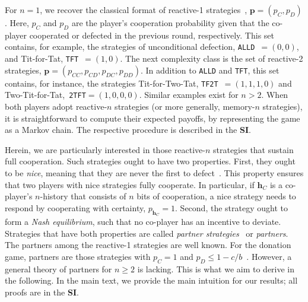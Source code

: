 \documentclass[9pt,twocolumn,twoside]{pnas-new}
\def\tft{\texttt{TFT}}
\def\tftt{\texttt{TF2T}}
\def\ttft{\texttt{2TFT}}
\def\alld{\texttt{ALLD}}
\def\SI{\textbf{SI}}
\begin{document}
For \(n\!=\!1\), we recover the classical format of reactive-1 strategies~\cite{sigmund2010}, \(\mathbf{p}\!=\!(p_C, p_D)\). 
Here, $p_C$ and $p_D$ are the player's cooperation probability given that the co-player cooperated or defected in the previous round, respectively. 
This set contains, for example, the strategies of unconditional defection, \alld~$=\!(0,0)$, and Tit-for-Tat, \tft~$=\!(1,0)$. 
The next complexity class is the set of reactive-2 strategies, $\mathbf{p}\!=\!(p_{CC},p_{CD},p_{DC},p_{DD})$.
In addition to \alld{} and \tft{}, this set contains, for instance, the strategies Tit-for-Two-Tat, \tftt~$=\!(1,1,1,0)$ and Two-Tit-for-Tat,~\ttft$=\!(1,0,0,0)$. 
Similar examples exist for $n\!>\!2$. 
When both players adopt reactive-$n$ strategies (or more generally, memory-$n$ strategies), it is straightforward to compute their expected payoffs, by representing the game as a Markov chain. 
The respective procedure is described in the \SI{}.  

Herein, we are particularly interested in those reactive-$n$ strategies that sustain full cooperation. 
Such strategies ought to have two properties. 
First, they ought to be {\it nice}, meaning that they are never the first to defect~\citep{axelrod:AAAS:1981}.
This property ensures that two players with nice strategies fully cooperate. 
In particular, if $\mathbf{h}_C$ is a co-player's $n$-history that consists of $n$ bits of cooperation, a nice strategy needs to respond by cooperating with certainty, $p_{\mathbf{h}_C}\!=\!1$.  
Second, the strategy ought to form a {\it Nash equilibrium}, such that no co-player has an incentive to deviate. 
Strategies that have both properties are called {\it partner strategies}~\citep{Hilbe:GEB:2015} or {\it partners}.
The partners among the reactive-1 strategies are well known. 
For the donation game, partners are those strategies with $p_C\!=\!1$ and $p_D\!\le\!1\!-\!c/b$~\citep{akin:EGADS:2016}. 
However, a general theory of partners for $n\!\ge\!2$ is lacking. 
This is what we aim to derive in the following. 
In the main text, we provide the main intuition for our results; all proofs are in the \SI.



\noindent
\end{document}
